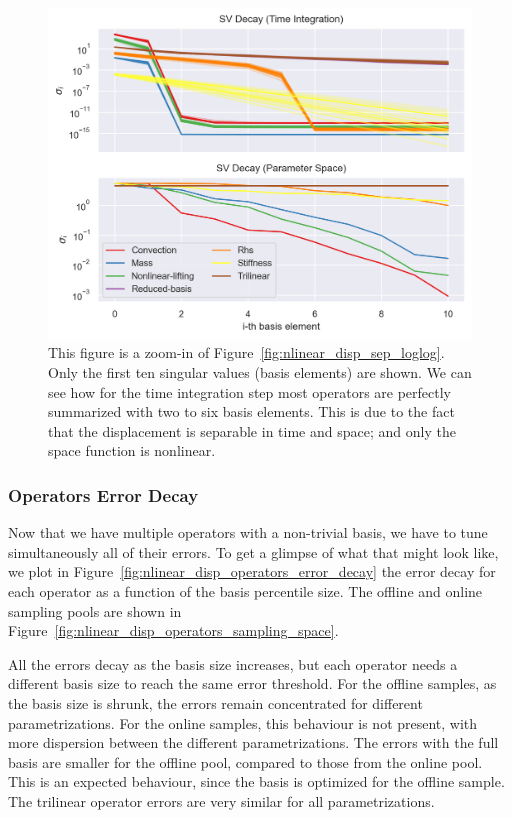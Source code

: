\documentclass[../../thesis.tex]{subfiles}
\begin{document}
\begin{figure}[h]
    \includegraphics[width =\columnwidth]{research_project/piston/figures/nonlinear_displacement/separable/sigmas_logy.png}
    \caption{This figure is a zoom-in of Figure~\ref{fig:nlinear_disp_sep_loglog}.
    Only the first ten singular values (basis elements) are shown.
    We can see how for the time integration step most operators 
    are perfectly summarized with two to six basis elements.
    This is due to the fact that the displacement is separable in time and space;
    and only the space function is nonlinear.}
    \label{fig:nlinear_disp_sep_logy}
\end{figure}

\subsubsection{Operators Error Decay}
Now that we have multiple operators with a non-trivial basis, 
we have to tune simultaneously all of their errors.
To get a glimpse of what that might look like, 
we plot in Figure~\ref{fig:nlinear_disp_operators_error_decay}
the error decay for each operator as a function of the basis percentile size.
The offline and online sampling pools are shown in 
Figure~\ref{fig:nlinear_disp_operators_sampling_space}.

All the errors decay as the basis size increases, 
but each operator needs a different basis size to reach the same error threshold.
For the offline samples, as the basis size is shrunk, 
the errors remain concentrated for different parametrizations.
For the online samples, this behaviour is not present, 
with more dispersion between the different parametrizations.
The errors with the full basis are smaller for the offline pool, 
compared to those from the online pool.
This is an expected behaviour, 
since the basis is optimized for the offline sample.
The trilinear operator errors are very similar for all parametrizations.
\end{document}
